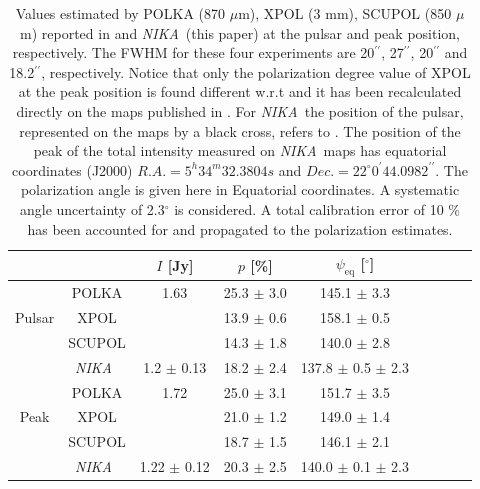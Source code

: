 \documentclass[twocolumn,traditabstract]{aa}
\def\NIKA{\textit{NIKA}}
\begin{document}
\begin{table}[h!]
  \centering
      \begin{tabular}{ccccccccc}
     &  & \small $I$ [Jy]& \small $p$ [\%] & \small $\psi_{\textrm{eq}}$ [$^\circ$] & \\ 
\hline
\hline
      &\small POLKA  & \small 1.63 & \small 25.3 $\pm$ \small 3.0 & \small 145.1 $\pm$ \small 3.3 & \\
      \small Pulsar &\small XPOL     & & \small 13.9 $\pm$ \small 0.6 & \small 158.1 $\pm$ \small 0.5 &  \\
      &\small SCUPOL &  & \small 14.3 $\pm$ \small 1.8 & \small 140.0 $\pm$ \small 2.8& \\
      &\small \NIKA\ & \small 1.2 $\pm$ \small 0.13 & \small 18.2 $\pm$ \small 2.4 & \small 137.8 $\pm$ \small 0.5 $\pm$ \small 2.3 \\
      \hline

      &\small POLKA & \small 1.72 & \small 25.0 $\pm$ \small 3.1 & \small 151.7 $\pm$ \small 3.5 &  \\
       \small Peak &\small XPOL  & &  \small 21.0 $\pm$ 1.2 & \small 149.0 $\pm $ \small 1.4 &  \\
      &\small SCUPOL &  & \small 18.7 $\pm$ 1.5 & \small 146.1 $\pm$ \small 2.1&\\
      &\small \NIKA\ &  \small 1.22 $\pm$ \small 0.12 & \small 20.3 $\pm$ \small 2.5 & \small 140.0 $\pm$ \small 0.1 $\pm$ \small 2.3 \\
             \hline
\hline
    \end{tabular}
   \caption{ Values estimated by POLKA (870 $\mu$m), XPOL (3 mm), SCUPOL (850 $\mu$m) reported in \cite{2014PASP..126.1027W} and \NIKA\ (this paper) at the pulsar and peak position, respectively. The FWHM for these four experiments are 20$^{\prime\prime}$, 27$^{\prime\prime}$, 20$^{\prime\prime}$ and 18.2$^{\prime\prime}$, respectively. Notice that only the polarization degree value of XPOL at the peak position is found different w.r.t \cite{2014PASP..126.1027W} and it has been recalculated directly on the maps published in \cite{aumont2010}. For \NIKA\ the position of the pulsar, represented on the maps by a black cross, refers to \cite{Lobanov}. The position of the peak of the total intensity measured on \NIKA\ maps has equatorial coordinates (J2000) $R.A. =5^h34^m32.3804s$ and $Dec. = 22^{\circ}0^{\prime}44.0982^{\prime\prime}$. The polarization angle is given here in Equatorial coordinates. A systematic angle uncertainty of 2.3$^{\circ}$ is considered. A total calibration error of 10 $\%$ has been accounted for and propagated 
to the polarization estimates.}
\label{tab:peak_pulsar_others}
 \end{table}
\end{document}
